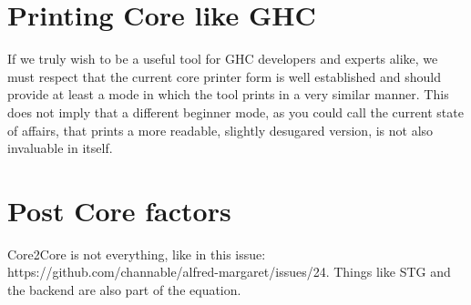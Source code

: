 \documentclass{report}
\begin{document}
\section{Printing Core like GHC}
If we truly wish to be a useful tool for GHC developers and experts alike, we must respect
that the current core printer form is well established and should provide at least a mode in which
the tool prints in a very similar manner. This does not imply that a different beginner mode, as you
could call the current state of affairs, that prints a more readable, slightly desugared version, 
is not also invaluable in itself.



\section{Post Core factors}
Core2Core is not everything, like in this issue: https://github.com/channable/alfred-margaret/issues/24.
Things like STG and the backend are also part of the equation.




\appendix
\clearpage
{}
\end{document}
